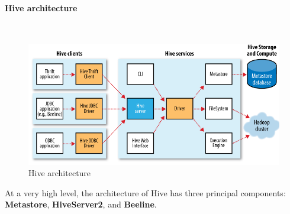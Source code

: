 \documentclass[12pt,english]{book}
\begin{document}
\paragraph{Hive architecture}\mbox{}\\

\begin{figure}[ht]
	\centering
	\includegraphics[width=\linewidth]{hiveSchema.png}
	\caption[Hive architecture]{Hive architecture \footnotemark}
\end{figure}


At a very high level, the architecture of Hive has three principal components: \textbf{Metastore}, \textbf{HiveServer2}, and \textbf{Beeline}.
\end{document}
